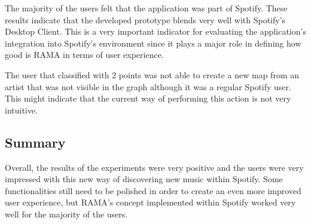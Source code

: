       The majority of the users felt that the application was part of Spotify.
      These results indicate that the developed prototype blends very well with Spotify's Desktop Client.
      This is a very important indicator for evaluating the application's integration into Spotify's environment since it plays a major role in defining how good is RAMA in terms of user experience.

      The user that classified with 2 points was not able to create a new map from an artist that was not visible in the graph although it was a regular Spotify user.
      This might indicate that the current way of performing this action is not very intuitive.
  

  \subsection{Summary}

    Overall, the results of the experiments were very positive and the users were very impressed with this new way of discovering new music within Spotify.
    Some functionalities still need to be polished in order to create an even more improved user experience, but RAMA's concept implemented within Spotify worked very well for the majority of the users.
  
